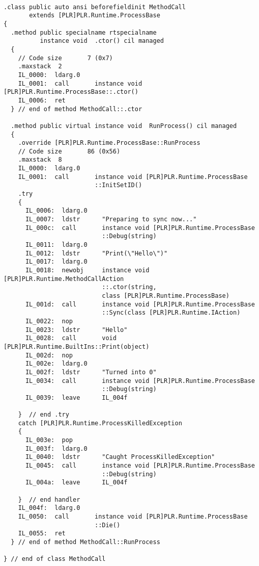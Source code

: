 \begin{lstlisting}

.class public auto ansi beforefieldinit MethodCall
       extends [PLR]PLR.Runtime.ProcessBase
{
  .method public specialname rtspecialname 
          instance void  .ctor() cil managed
  {
    // Code size       7 (0x7)
    .maxstack  2
    IL_0000:  ldarg.0
    IL_0001:  call       instance void [PLR]PLR.Runtime.ProcessBase::.ctor()
    IL_0006:  ret
  } // end of method MethodCall::.ctor

  .method public virtual instance void  RunProcess() cil managed
  {
    .override [PLR]PLR.Runtime.ProcessBase::RunProcess
    // Code size       86 (0x56)
    .maxstack  8
    IL_0000:  ldarg.0
    IL_0001:  call       instance void [PLR]PLR.Runtime.ProcessBase
                         ::InitSetID()
    .try
    {
      IL_0006:  ldarg.0
      IL_0007:  ldstr      "Preparing to sync now..."
      IL_000c:  call       instance void [PLR]PLR.Runtime.ProcessBase
                           ::Debug(string)
      IL_0011:  ldarg.0
      IL_0012:  ldstr      "Print(\"Hello\")"
      IL_0017:  ldarg.0
      IL_0018:  newobj     instance void [PLR]PLR.Runtime.MethodCallAction
                           ::.ctor(string, 
                           class [PLR]PLR.Runtime.ProcessBase)
      IL_001d:  call       instance void [PLR]PLR.Runtime.ProcessBase
                           ::Sync(class [PLR]PLR.Runtime.IAction)
      IL_0022:  nop
      IL_0023:  ldstr      "Hello"
      IL_0028:  call       void [PLR]PLR.Runtime.BuiltIns::Print(object)
      IL_002d:  nop
      IL_002e:  ldarg.0
      IL_002f:  ldstr      "Turned into 0"
      IL_0034:  call       instance void [PLR]PLR.Runtime.ProcessBase
                           ::Debug(string)
      IL_0039:  leave      IL_004f

    }  // end .try
    catch [PLR]PLR.Runtime.ProcessKilledException 
    {
      IL_003e:  pop
      IL_003f:  ldarg.0
      IL_0040:  ldstr      "Caught ProcessKilledException"
      IL_0045:  call       instance void [PLR]PLR.Runtime.ProcessBase
                           ::Debug(string)
      IL_004a:  leave      IL_004f

    }  // end handler
    IL_004f:  ldarg.0
    IL_0050:  call       instance void [PLR]PLR.Runtime.ProcessBase
                         ::Die()
    IL_0055:  ret
  } // end of method MethodCall::RunProcess

} // end of class MethodCall

\end{lstlisting}

